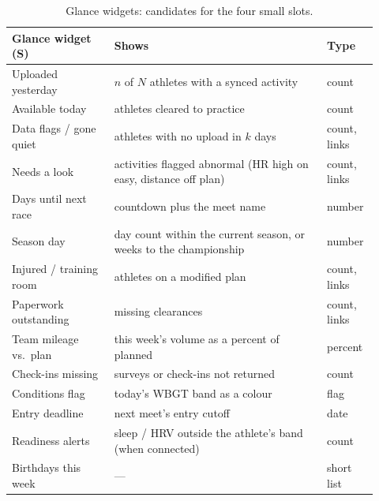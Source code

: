 \documentclass[11pt]{article}
\begin{document}
\begin{table}[tbp]
\centering\small
\begin{tabular}{@{}p{0.26\linewidth}p{0.54\linewidth}>{\raggedright\arraybackslash}p{0.12\linewidth}@{}}
\toprule
\textbf{Glance widget (S)} & \textbf{Shows} & \textbf{Type}\\
\midrule
Uploaded yesterday & $n$ of $N$ athletes with a synced activity & count\\
Available today & athletes cleared to practice & count\\
Data flags / gone quiet & athletes with no upload in $k$ days & count, links\\
Needs a look & activities flagged abnormal (HR high on easy, distance off plan) & count, links\\
Days until next race & countdown plus the meet name & number\\
Season day & day count within the current season, or weeks to the championship & number\\
Injured / training room & athletes on a modified plan & count, links\\
Paperwork outstanding & missing clearances & count, links\\
Team mileage vs.\ plan & this week's volume as a percent of planned & percent\\
Check-ins missing & surveys or check-ins not returned & count\\
Conditions flag & today's WBGT band as a colour & flag\\
Entry deadline & next meet's entry cutoff & date\\
Readiness alerts & sleep / HRV outside the athlete's band (when connected) & count\\
Birthdays this week & --- & short list\\
\bottomrule
\end{tabular}
\caption{Glance widgets: candidates for the four small slots.}
\label{tab:glance}
\end{table}
\end{document}
